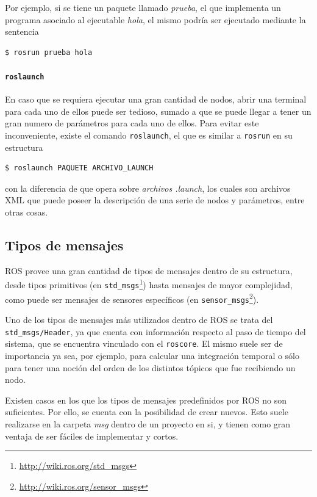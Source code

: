 Por ejemplo, si se tiene un paquete llamado \textit{prueba}, el que implementa un programa asociado al ejecutable \textit{hola}, el mismo podría ser ejecutado mediante la sentencia
\begin{lstlisting}[language=bash]
  $ rosrun prueba hola
\end{lstlisting}

\paragraph{\texttt{roslaunch}}
En caso que se requiera ejecutar una gran cantidad de nodos, abrir una terminal para cada uno de ellos puede ser tedioso, sumado a que se puede llegar a tener un gran numero de parámetros para cada uno de ellos. Para evitar este inconveniente, existe el comando \texttt{roslaunch}, el que es similar a \texttt{rosrun} en su estructura
\begin{lstlisting}[language=bash]
  $ roslaunch PAQUETE ARCHIVO_LAUNCH
\end{lstlisting}
con la diferencia de que opera sobre \textit{archivos .launch}, los cuales son archivos XML que puede poseer la descripción de una serie de nodos y parámetros, entre otras cosas.

\subsection{Tipos de mensajes}
ROS provee una gran cantidad de tipos de mensajes dentro de su estructura, desde tipos primitivos (en \texttt{std\_msgs}\footnote{\url{http://wiki.ros.org/std_msgs}}) hasta mensajes de mayor complejidad, como puede ser mensajes de sensores específicos (en \texttt{sensor\_msgs}\footnote{\url{http://wiki.ros.org/sensor_msgs}}).

Uno de los tipos de mensajes más utilizados dentro de ROS se trata del \texttt{std\_msgs/Header}, ya que cuenta con información respecto al paso de tiempo del sistema, que se encuentra vinculado con el \texttt{roscore}. El mismo suele ser de importancia ya sea, por ejemplo, para calcular una integración temporal o sólo para tener una noción del orden de los distintos tópicos que fue recibiendo un nodo.

Existen casos en los que los tipos de mensajes predefinidos por ROS no son suficientes. Por ello, se cuenta con la posibilidad de crear nuevos. Esto suele realizarse en la carpeta \textit{msg} dentro de un proyecto en si, y tienen como gran ventaja de ser fáciles de implementar y cortos.

